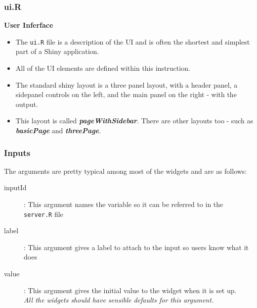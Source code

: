 \documentclass{beamer}
\begin{document}
\begin{frame}
	\frametitle{ui.R}
	\Large
	\textbf{User Inferface}
	\begin{itemize}
		\item The \texttt{ui.R} file is a description of the UI and is often the shortest and simplest part of
		a Shiny application. \item All of the UI elements are defined
		within this instruction.
		\item The standard shiny layout is a three panel layout, with a header panel, a sidepanel 
		controls on the left, and the main panel on the right - with the output.
		\item This layout is called \textbf{\emph{pageWithSidebar}}. There are other layouts too - such as \textbf{\textit{basicPage}} and \textbf{\textit{threePage}}.
	\end{itemize}
	
\end{frame}
\begin{frame}
	\Large
	\frametitle{Inputs}
	The arguments are pretty typical among most of the widgets and are
	as follows:
	\begin{description}
		\item[ inputId]: This argument names the variable so it can be referred to in the
		\texttt{server.R} file
		\item[ label]: This argument gives a label to attach to the input so users know
		what it does
		\item[value]: This argument gives the initial value to the widget when it is
		set up. \\\textit{All the widgets should have sensible defaults for this argument.}
	\end{description}
\end{frame}
\end{document}
